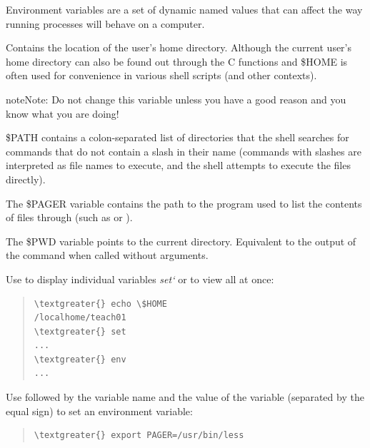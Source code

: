 \documentclass[letterpaper,10pt,english]{sphinxmanual}
\begin{document}
Environment variables are a set of dynamic named values that can affect the way running processes will behave on a computer.

Contains the location of the user's home directory. Although the current user's home directory can also be found out through the
C functions  and  \$HOME is often used for convenience in various shell scripts (and other contexts).

\begin{notice}{note}{Note:}
Do not change this variable unless you have a good reason and you know what you are doing!
\end{notice}

\$PATH contains a colon-separated list of directories that the shell searches for commands that do not contain a slash in their name
(commands with slashes are interpreted as file names to execute, and the shell attempts to execute the files directly).

The \$PAGER variable contains the path to the program used to list the contents of files through (such as  or ).

The \$PWD variable points to the current directory. Equivalent to the output of the command  when called without arguments.

Use  to display individual variables \emph{set{}`} or  to view all at once:
\begin{quote}

\begin{Verbatim}[commandchars=\\\{\}]
\textgreater{} echo \$HOME
/localhome/teach01
\textgreater{} set
...
\textgreater{} env
...
\end{Verbatim}
\end{quote}

Use  followed by the variable name and the value of the variable (separated by the equal sign) to set an environment variable:
\begin{quote}

\begin{Verbatim}[commandchars=\\\{\}]
\textgreater{} export PAGER=/usr/bin/less
\end{Verbatim}
\end{quote}
\end{document}
